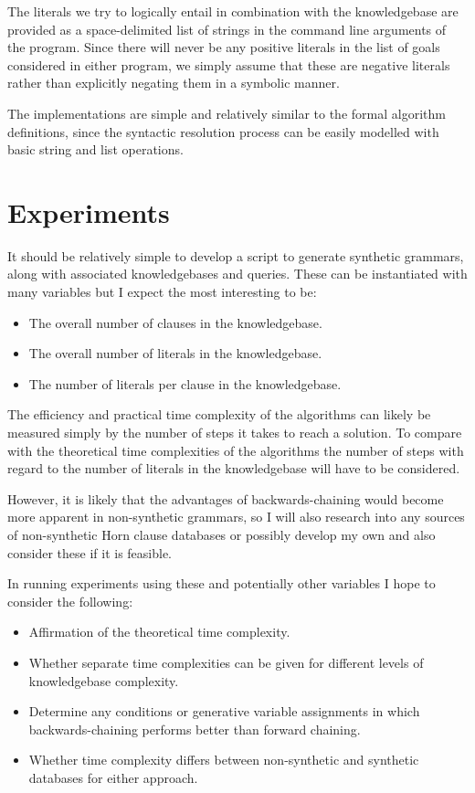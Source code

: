 \documentclass{article}
\begin{document}
The literals we try to logically entail in combination with the knowledgebase are
provided as a space-delimited list of strings in the command line arguments of
the program. Since there will never be any positive literals in the list of
goals considered in either program, we simply assume that these are negative
literals rather than explicitly negating them in a symbolic manner.

The implementations are simple and relatively similar to the formal algorithm
definitions, since the syntactic resolution process can be easily modelled with
basic string and list operations.

\section{Experiments}

It should be relatively simple to develop a script to generate synthetic
grammars, along with associated knowledgebases and queries. These can be
instantiated with many variables but I expect the most interesting to be:

\begin{itemize}
  \item The overall number of clauses in the knowledgebase.
  \item The overall number of literals in the knowledgebase.
  \item The number of literals per clause in the knowledgebase.
\end{itemize}

The efficiency and practical time complexity of the algorithms can likely be
measured simply by the number of steps it takes to reach a solution. To compare
with the theoretical time complexities of the algorithms the number of steps
with regard to the number of literals in the knowledgebase will have to be
considered.

However, it is likely that the advantages of backwards-chaining would become
more apparent in non-synthetic grammars, so I will also research into any
sources of non-synthetic Horn clause databases or possibly develop my own and
also consider these if it is feasible.

In running experiments using these and potentially other
variables I hope to consider the following:

\begin{itemize}
  \item Affirmation of the theoretical time complexity.
  \item Whether separate time complexities can be given for different levels of
  knowledgebase complexity.
  \item Determine any conditions or generative variable assignments in which
  backwards-chaining performs better than forward chaining.
  \item Whether time complexity differs between non-synthetic and synthetic
  databases for either approach.
\end{itemize}
\end{document}
